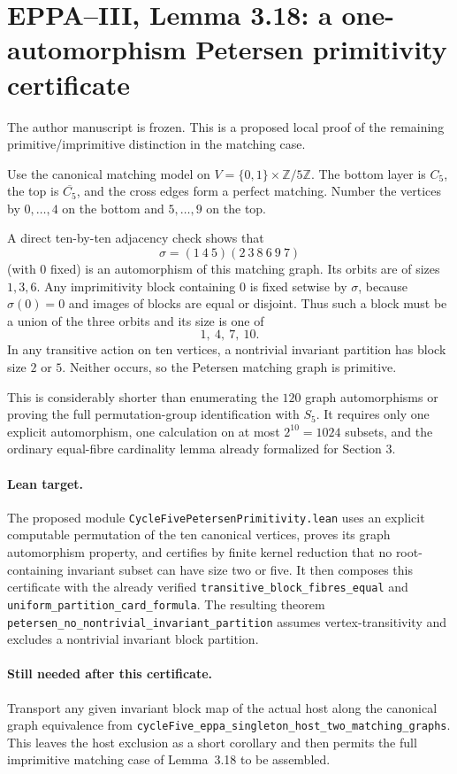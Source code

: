 \documentclass[11pt]{article}
\begin{document}
\section*{EPPA--III, Lemma 3.18: a one-automorphism Petersen primitivity certificate}
The author manuscript is frozen. This is a proposed local proof
of the remaining primitive/imprimitive distinction in the matching case.

Use the canonical matching model on
\(V=\{0,1\}\times\mathbb Z/5\mathbb Z\).
The bottom layer is \(C_5\), the top is
\(\overline{C_5}\), and the cross edges form a perfect
matching. Number the vertices by \(0,\ldots,4\)
on the bottom and \(5,\ldots,9\) on the top.

A direct ten-by-ten adjacency check shows that
\[
   \sigma=(1\ 4\ 5)(2\ 3\ 8\ 6\ 9\ 7)
\]
(with \(0\) fixed) is an automorphism of this
matching graph. Its orbits are of sizes \(1,3,6\).
Any imprimitivity block containing \(0\) is fixed
setwise by \(\sigma\), because \(\sigma(0)=0\) and
images of blocks are equal or disjoint.
Thus such a block must be a union of the three
orbits and its size is one of
\[
                   1,\ 4,\ 7,\ 10.
\]
In any transitive action on ten vertices, a
nontrivial invariant partition has block size
\(2\) or \(5\). Neither occurs, so the Petersen
matching graph is primitive.

This is considerably shorter than enumerating
the \(120\) graph automorphisms or proving the full
permutation-group identification with \(S_5\).
It requires only one explicit automorphism,
one calculation on at most \(2^{10}=1024\) subsets,
and the ordinary equal-fibre cardinality lemma
already formalized for Section 3.

\paragraph{Lean target.}
The proposed module
\texttt{CycleFivePetersenPrimitivity.lean}
uses an explicit computable permutation of
the ten canonical vertices, proves its graph
automorphism property, and certifies by finite
kernel reduction that no root-containing invariant
subset can have size two or five.
It then composes this certificate with the
already verified \texttt{transitive\_block\_fibres\_equal}
and \texttt{uniform\_partition\_card\_formula}.
The resulting theorem
\texttt{petersen\_no\_nontrivial\_invariant\_partition}
assumes vertex-transitivity and excludes a nontrivial
invariant block partition.

\paragraph{Still needed after this certificate.}
Transport any given invariant block map of the actual
host along the canonical graph equivalence from
\texttt{cycleFive\_eppa\_singleton\_host\_two\_matching\_graphs}.
This leaves the host exclusion as a short corollary and
then permits the full imprimitive matching case of
Lemma~3.18 to be assembled.
\end{document}
